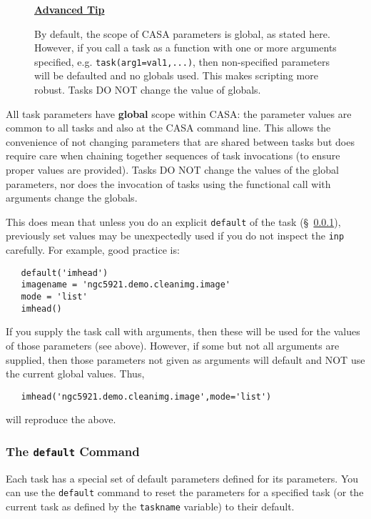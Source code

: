 \begin{wrapfigure}{r}{2.5in}
  \begin{boxedminipage}{2.5in}
     \centerline{\underline{\bf Advanced Tip}}
     By default, the scope of CASA parameters is global, as stated
     here.  However, if you call a task as a function with one or
     more arguments specified, e.g. {\tt task(arg1=val1,...)}, then
     non-specified parameters will be defaulted and no globals used.
     This makes scripting more robust.  Tasks DO NOT change the value
     of globals.
  \end{boxedminipage}
\end{wrapfigure}
All task parameters have {\bf global} scope within CASA: the
parameter values are common to all tasks and also at the CASA command
line. This allows the convenience of not changing parameters that are
shared between tasks but does require care when chaining together
sequences of task invocations (to ensure proper values are provided).
Tasks DO NOT change the values of the global parameters, nor does the
invocation of tasks using the functional call with arguments change
the globals.

This does mean that unless you do an explicit {\tt default} of the task
(\S~\ref{section:intro.tasks.setpar.default}), previously set values
may be unexpectedly used if you do not inspect the {\tt inp}
carefully.  For example, good practice is:
\small
\begin{verbatim}
   default('imhead')
   imagename = 'ngc5921.demo.cleanimg.image'
   mode = 'list'
   imhead()
\end{verbatim}
\normalsize

If you supply the task call with arguments, then these will be used
for the values of those parameters (see above).  However, if some but
not all arguments are supplied, then those parameters not given as
arguments will default and NOT use the current global values.  Thus,
\small
\begin{verbatim}
   imhead('ngc5921.demo.cleanimg.image',mode='list')
\end{verbatim}
\normalsize
will reproduce the above.

\subsubsection{The {\tt default} Command}
\label{section:intro.tasks.setpar.default}

Each task has a special set of default parameters defined for its
parameters.  You can use the {\tt default} command to reset the
parameters for a specified task (or the current task as defined
by the {\tt taskname} variable) to their default. 

